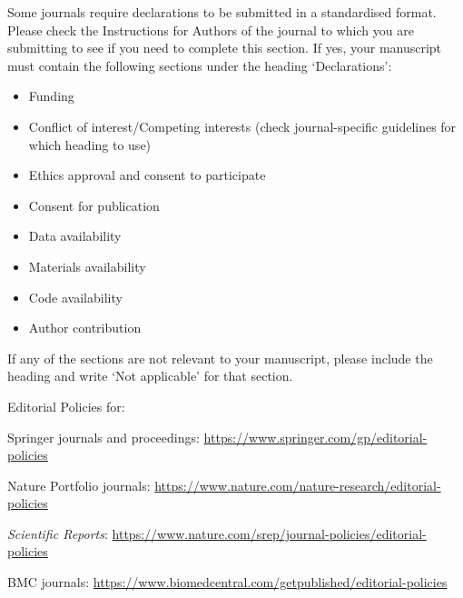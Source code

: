 \documentclass[pdflatex,sn-mathphys-num]{sn-jnl}%
\theoremstyle{thmstyleone}%
\theoremstyle{thmstyletwo}%
\theoremstyle{thmstylethree}%
\begin{document}
Some journals require declarations to be submitted in a standardised format. Please check the Instructions for Authors of the journal to which you are submitting to see if you need to complete this section. If yes, your manuscript must contain the following sections under the heading `Declarations':

\begin{itemize}
\item Funding
\item Conflict of interest/Competing interests (check journal-specific guidelines for which heading to use)
\item Ethics approval and consent to participate
\item Consent for publication
\item Data availability 
\item Materials availability
\item Code availability 
\item Author contribution
\end{itemize}

\noindent
If any of the sections are not relevant to your manuscript, please include the heading and write `Not applicable' for that section. 

\bigskip
\begin{flushleft}%
Editorial Policies for:

\bigskip\noindent
Springer journals and proceedings: \url{https://www.springer.com/gp/editorial-policies}

\bigskip\noindent
Nature Portfolio journals: \url{https://www.nature.com/nature-research/editorial-policies}

\bigskip\noindent
\textit{Scientific Reports}: \url{https://www.nature.com/srep/journal-policies/editorial-policies}

\bigskip\noindent
BMC journals: \url{https://www.biomedcentral.com/getpublished/editorial-policies}
\end{flushleft}
\end{document}
